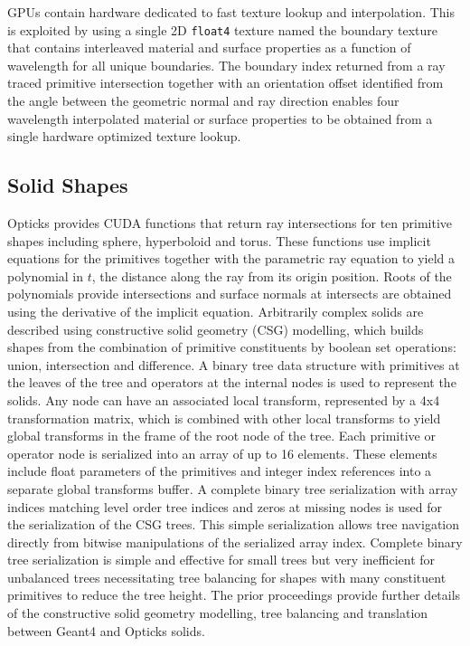 \documentclass{webofc}
\begin{document}
GPUs contain hardware dedicated to fast texture lookup and interpolation.
This is exploited by using a single 2D {\tt float4} texture named the boundary texture
that contains interleaved material and surface properties as a function of wavelength for all
unique boundaries.
The boundary index returned from a ray traced primitive intersection together with
an orientation offset identified from the angle between the geometric normal and ray direction
enables four wavelength interpolated material or surface properties to be
obtained from a single hardware optimized texture lookup.

\subsection{Solid Shapes}%
%
Opticks provides CUDA functions that return ray intersections for ten primitive shapes including sphere, hyperboloid and torus.
These functions use implicit equations for the primitives together with 
the parametric ray equation to yield a polynomial in $t$, the distance along the ray from its origin position. 
Roots of the polynomials provide intersections and surface normals at intersects are obtained
using the derivative of the implicit equation.
%
Arbitrarily complex solids are described using constructive solid geometry (CSG) modelling, 
which builds shapes from the combination of primitive constituents by boolean set operations: union, intersection and difference.
A binary tree data structure with primitives at the leaves of the tree and operators at the internal nodes is used
to represent the solids. Any node can have an associated local transform, represented by a 4x4 transformation matrix, which 
is combined with other local transforms to yield global transforms in the frame of the root node of the tree.
%
Each primitive or operator node is serialized into an array of up to 16 elements. 
These elements include float parameters of the primitives and integer index references 
into a separate global transforms buffer. 
A complete binary tree serialization with array indices matching level order tree indices
and zeros at missing nodes is used for the serialization of the CSG trees. This simple 
serialization allows tree navigation directly from bitwise manipulations of the serialized array index.
%
Complete binary tree serialization is simple and effective for small trees but very inefficient 
for unbalanced trees necessitating tree balancing for shapes with many constituent primitives 
to reduce the tree height. 
The prior proceedings\cite{chep2018} provide further details of the constructive solid geometry modelling, 
tree balancing and translation between Geant4 and Opticks solids.
\end{document}
